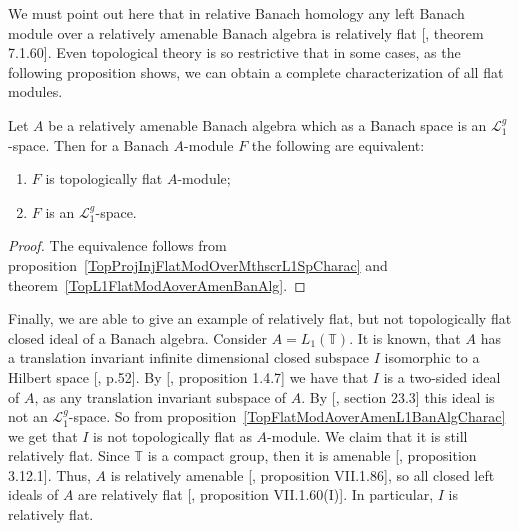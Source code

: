 We must point out here that in relative Banach homology any left Banach module
over a relatively amenable Banach algebra is relatively flat
[\cite{HelBanLocConvAlg}, theorem 7.1.60]. Even topological theory is so
restrictive that in some cases, as the following proposition shows, we can
obtain a complete characterization of all flat modules.

\begin{proposition}\label{TopFlatModAoverAmenL1BanAlgCharac} Let $A$ be a
relatively amenable Banach algebra which as a Banach space is an
$\mathscr{L}_1^g$-space. Then for a Banach $A$-module $F$ the following are
equivalent:

\begin{enumerate}[label = (\roman*)]
    \item $F$ is topologically flat $A$-module; 

    \item $F$ is an $\mathscr{L}_1^g$-space.
\end{enumerate}
\end{proposition}
\begin{proof} The equivalence follows from
proposition~\ref{TopProjInjFlatModOverMthscrL1SpCharac} and
theorem~\ref{TopL1FlatModAoverAmenBanAlg}.
\end{proof}

Finally, we are able to give an example of relatively flat, but not topologically
flat closed ideal of a Banach algebra. Consider $A=L_1(\mathbb{T})$. It is known, that
$A$ has a translation invariant infinite dimensional closed subspace $I$
isomorphic to a Hilbert space [\cite{RosProjTransInvSbspLpG}, p.52]. By
[\cite{KaniBanAlg}, proposition 1.4.7] we have that $I$ is a two-sided ideal of
$A$, as any translation invariant subspace of $A$. By [\cite{DefFloTensNorOpId},
section 23.3] this ideal is not an $\mathscr{L}_1^g$-space. So from
proposition~\ref{TopFlatModAoverAmenL1BanAlgCharac} we get that $I$ is not
topologically flat as $A$-module. We claim that it is still relatively flat. Since
$\mathbb{T}$ is a compact group, then it is amenable [\cite{PierAmenLCA},
proposition 3.12.1]. Thus, $A$ is relatively amenable [\cite{HelBanLocConvAlg},
proposition VII.1.86], so all closed left ideals of $A$ are relatively flat
[\cite{HelBanLocConvAlg}, proposition VII.1.60(I)]. In particular, $I$ is
relatively flat.


